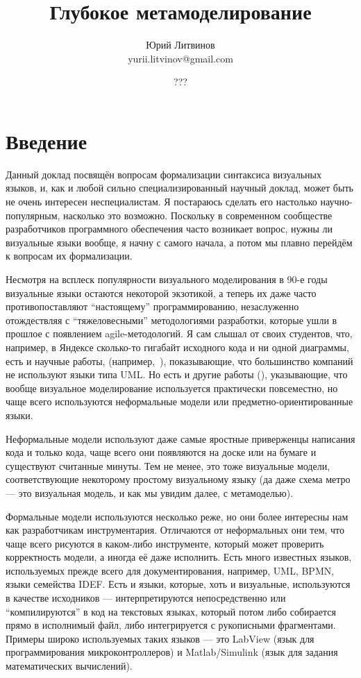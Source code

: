 \documentclass[a5paper]{article}
\title{Глубокое метамоделирование}
\author{Юрий Литвинов\\\small{yurii.litvinov@gmail.com}}
\date{???}
\begin{document}
\maketitle
\thispagestyle{empty}

\section*{Введение}

Данный доклад посвящён вопросам формализации синтаксиса визуальных языков, и, как и любой сильно специализированный научный доклад, может быть не очень интересен неспециалистам. Я постараюсь сделать его настолько научно-популярным, насколько это возможно. Поскольку в современном сообществе разработчиков программного обеспечения часто возникает вопрос, нужны ли визуальные языки вообще, я начну с самого начала, а потом мы плавно перейдём к вопросам их формализации.

Несмотря на всплеск популярности визуального моделирования в 90-е годы визуальные языки остаются некоторой экзотикой, а теперь их даже часто противопоставляют ``настоящему'' программированию, незаслуженно отождествляя с ``тяжеловесными'' методологиями разработки, которые ушли в прошлое с появлением agile-методологий. Я сам слышал от своих студентов, что, например, в Яндексе сколько-то гигабайт исходного кода и ни одной диаграммы, есть и научные работы, (например,~\cite{petre2013uml}), показывающие, что большинство компаний не используют языки типа UML. Но есть и другие работы (\cite{whittle2014mde}), указывающие, что вообще визуальное моделирование используется практически повсеместно, но чаще всего используются неформальные модели или предметно-ориентированные языки.

Неформальные модели используют даже самые яростные приверженцы написания кода и только кода, чаще всего они появляются на доске или на бумаге и существуют считанные минуты. Тем не менее, это тоже визуальные модели, соответствующие некоторому простому визуальному языку (да даже схема метро --- это визуальная модель, и как мы увидим далее, с метамоделью). 

Формальные модели используются несколько реже, но они более интересны нам как разработчикам инструментария. Отличаются от неформальных они тем, что чаще всего рисуются в каком-либо инструменте, который может проверить корректность модели, а иногда её даже исполнить. Есть много известных языков, используемых прежде всего для документирования, например, UML, BPMN, языки семейства IDEF. Есть и языки, которые, хоть и визуальные, используются в качестве исходников --- интерпретируются непосредственно или ``компилируются'' в код на текстовых языках, который потом либо собирается прямо в исполнимый файл, либо интегрируется с рукописными фрагментами. Примеры широко используемых таких языков --- это LabView (язык для программирования микроконтроллеров) и Matlab/Simulink (язык для задания математических вычислений).
\end{document}
